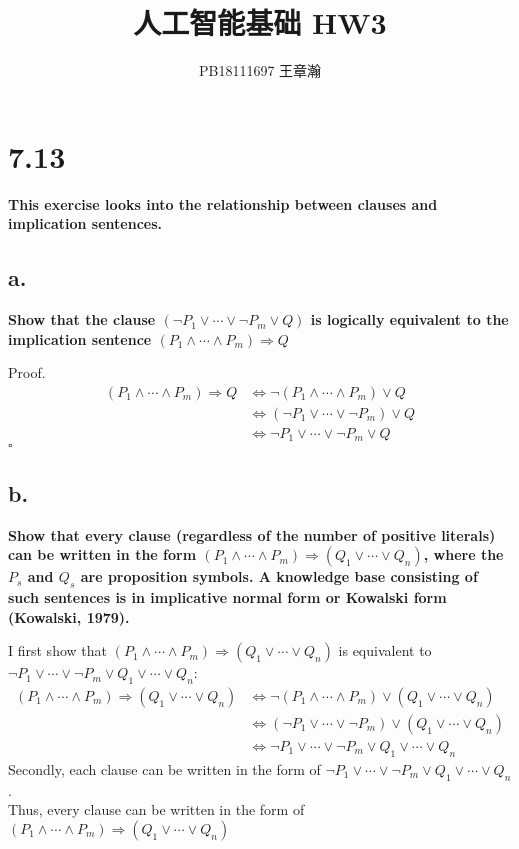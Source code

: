 \documentclass[UTF8]{article}
\title{人工智能基础 HW3}
\author{PB18111697 王章瀚}
\newcommand{\jumpLine} {\hspace*{\fill} \par}
\begin{document}
\maketitle
\section*{7.13}
\noindent\textbf{This exercise looks into the relationship between clauses and implication sentences.}
\subsection*{a.}
\noindent \textbf{Show that the clause $(\lnot P_1\lor \cdots\lor \lnot P_m\lor Q)$ is logically equivalent to the implication sentence $(P_1\land\cdots\land P_m)\Rightarrow Q$}\\
\jumpLine\noindent 
Proof.
\begin{align*}
	(P_1\land\cdots\land P_m)\Rightarrow Q &\Leftrightarrow \lnot(P_1\land\cdots\land P_m)\lor Q \\
	&\Leftrightarrow (\lnot P_1\lor\cdots\lor\lnot P_m)\lor Q \\
	&\Leftrightarrow \lnot P_1\lor\cdots\lor\lnot P_m\lor Q
\end{align*}
\hfill $\square$

\subsection*{b.}
\noindent \textbf{Show that every clause (regardless of the number of positive literals) can be written in the form $(P_1\land\cdots\land P_m)\Rightarrow (Q_1\lor\cdots\lor Q_n)$, where the $P_s$ and $Q_s$ are proposition symbols. A knowledge base consisting of such sentences is in implicative normal form or Kowalski form (Kowalski, 1979). }\\
\jumpLine\noindent 
I first show that $(P_1\land\cdots\land P_m)\Rightarrow (Q_1\lor\cdots\lor Q_n)$ is equivalent to $\lnot P_1\lor\cdots\lor\lnot P_m\lor Q_1\lor\cdots\lor Q_n$:
\begin{align*}
	(P_1\land\cdots\land P_m)\Rightarrow (Q_1\lor\cdots\lor Q_n) &\Leftrightarrow \lnot(P_1\land\cdots\land P_m)\lor (Q_1\lor\cdots\lor Q_n) \\
	&\Leftrightarrow (\lnot P_1\lor\cdots\lor\lnot P_m)\lor (Q_1\lor\cdots\lor Q_n) \\
	&\Leftrightarrow \lnot P_1\lor\cdots\lor\lnot P_m\lor Q_1\lor\cdots\lor Q_n
\end{align*}
Secondly, each clause can be written in the form of $\lnot P_1\lor\cdots\lor\lnot P_m\lor Q_1\lor\cdots\lor Q_n$. \\
Thus, every clause can be written in the form of $(P_1\land\cdots\land P_m)\Rightarrow (Q_1\lor\cdots\lor Q_n)$
\end{document}
